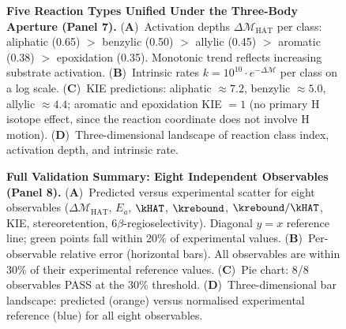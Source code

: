 \begin{figure}[htbp]
\caption{\textbf{Five Reaction Types Unified Under the Three-Body Aperture (Panel 7).}
(\textbf{A})~Activation depths $\Delta\mathcal{M}_{\mathrm{HAT}}$ per class:
aliphatic (0.65) $>$ benzylic (0.50) $>$ allylic (0.45) $>$ aromatic (0.38)
$>$ epoxidation (0.35). Monotonic trend reflects increasing substrate activation.
(\textbf{B})~Intrinsic rates $k = 10^{10} \cdot e^{-\Delta\mathcal{M}}$ per class on
a log scale.
(\textbf{C})~KIE predictions: aliphatic $\approx 7.2$, benzylic $\approx 5.0$,
allylic $\approx 4.4$; aromatic and epoxidation KIE $= 1$ (no primary H isotope
effect, since the reaction coordinate does not involve H motion).
(\textbf{D})~Three-dimensional landscape of reaction class index, activation depth,
and intrinsic rate.}
\label{fig:reaction_types}
\end{figure}

\begin{figure}[htbp]
\caption{\textbf{Full Validation Summary: Eight Independent Observables (Panel 8).}
(\textbf{A})~Predicted versus experimental scatter for eight observables
($\Delta\mathcal{M}_{\mathrm{HAT}}$, $E_a$, $\kHAT$, $\krebound$,
$\krebound/\kHAT$, KIE, stereoretention, $6\beta$-regioselectivity). Diagonal $y=x$
reference line; green points fall within 20\% of experimental values.
(\textbf{B})~Per-observable relative error (horizontal bars). All observables are
within 30\% of their experimental reference values.
(\textbf{C})~Pie chart: 8/8 observables PASS at the 30\% threshold.
(\textbf{D})~Three-dimensional bar landscape: predicted (orange) versus normalised
experimental reference (blue) for all eight observables.}
\label{fig:validation}
\end{figure}
